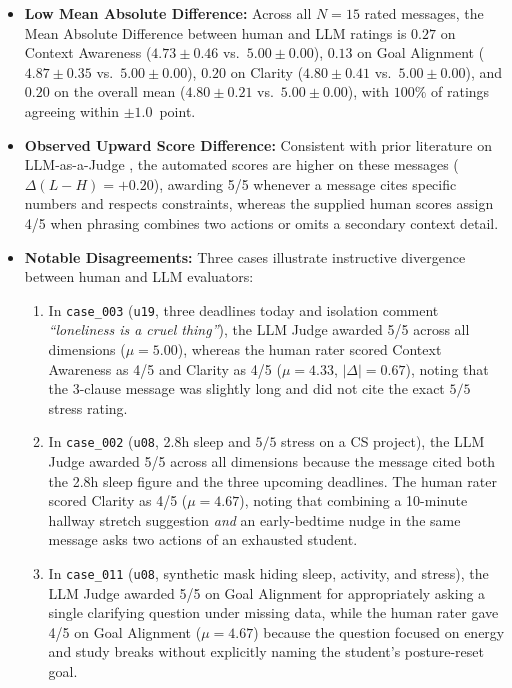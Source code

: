 \documentclass{article}
\begin{document}
\begin{itemize}
  \item \textbf{Low Mean Absolute Difference:} Across all $N=15$ rated messages, the Mean Absolute Difference between human and LLM ratings is $0.27$ on Context Awareness ($4.73 \pm 0.46$ vs.\ $5.00 \pm 0.00$), $0.13$ on Goal Alignment ($4.87 \pm 0.35$ vs.\ $5.00 \pm 0.00$), $0.20$ on Clarity ($4.80 \pm 0.41$ vs.\ $5.00 \pm 0.00$), and $0.20$ on the overall mean ($4.80 \pm 0.21$ vs.\ $5.00 \pm 0.00$), with $100\%$ of ratings agreeing within $\pm 1.0$~point.
  \item \textbf{Observed Upward Score Difference:} Consistent with prior literature on LLM-as-a-Judge \cite{zheng2023judging}, the automated scores are higher on these messages ($\Delta(L - H) = +0.20$), awarding 5/5 whenever a message cites specific numbers and respects constraints, whereas the supplied human scores assign 4/5 when phrasing combines two actions or omits a secondary context detail.
  \item \textbf{Notable Disagreements:} Three cases illustrate instructive divergence between human and LLM evaluators:
        \begin{enumerate}
          \item In \texttt{case\_003} (\texttt{u19}, three deadlines today and isolation comment \emph{``loneliness is a cruel thing''}), the LLM Judge awarded 5/5 across all dimensions ($\mu=5.00$), whereas the human rater scored Context Awareness as 4/5 and Clarity as 4/5 ($\mu=4.33$, $|\Delta|=0.67$), noting that the 3-clause message was slightly long and did not cite the exact $5/5$ stress rating.
          \item In \texttt{case\_002} (\texttt{u08}, 2.8h sleep and $5/5$ stress on a CS project), the LLM Judge awarded 5/5 across all dimensions because the message cited both the 2.8h sleep figure and the three upcoming deadlines. The human rater scored Clarity as 4/5 ($\mu=4.67$), noting that combining a 10-minute hallway stretch suggestion \emph{and} an early-bedtime nudge in the same message asks two actions of an exhausted student.
          \item In \texttt{case\_011} (\texttt{u08}, synthetic mask hiding sleep, activity, and stress), the LLM Judge awarded 5/5 on Goal Alignment for appropriately asking a single clarifying question under missing data, while the human rater gave 4/5 on Goal Alignment ($\mu=4.67$) because the question focused on energy and study breaks without explicitly naming the student's posture-reset goal.
        \end{enumerate}
\end{itemize}
\end{document}
